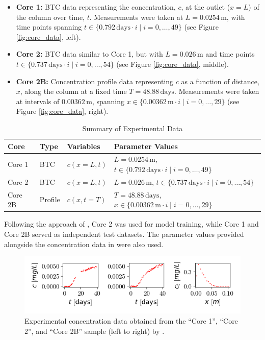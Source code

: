 \begin{itemize}
    \item \textbf{Core 1:} BTC data representing the concentration, $c$, at the outlet ($x = L$) of the column over time, $t$. Measurements were taken at $L = 0.0254\,\text{m}$, with time points spanning $t \in \{0.792\,\text{days} \cdot i \mid i = 0, \dots, 49\}$ (see Figure \vref{fig:core_data}, left).
    \item \textbf{Core 2:} BTC data similar to Core 1, but with $L = 0.026\,\text{m}$ and time points $t \in \{0.737\,\text{days} \cdot i \mid i = 0, \dots, 54\}$ (see Figure \vref{fig:core_data}, middle).
    \item \textbf{Core 2B:} Concentration profile data representing $c$ as a function of distance, $x$, along the column at a fixed time $T = 48.88\,\text{days}$. Measurements were taken at intervals of $0.00362\,\text{m}$, spanning $x \in \{0.00362\,\text{m} \cdot i \mid i = 0, \dots, 29\}$ (see Figure \vref{fig:core_data}, right).
\end{itemize}

\begin{table}[h!]
    \centering
    \caption{Summary of Experimental Data}
    \label{tab:experimental_data}
    \begin{tabular}{llll}
        \toprule
        Core   & Type       & Variables                 & Parameter Values                                      \\
        \midrule
        Core 1 & BTC        & $c(x=L, t)$              & $L = 0.0254\,\text{m}$, $t \in \{0.792\,\text{days} \cdot i \mid i = 0, \dots, 49\}$ \\
        Core 2 & BTC        & $c(x=L, t)$              & $L = 0.026\,\text{m}$, $t \in \{0.737\,\text{days} \cdot i \mid i = 0, \dots, 54\}$  \\
        Core 2B & Profile    & $c(x, t=T)$              & $T = 48.88\,\text{days}$, $x \in \{0.00362\,\text{m} \cdot i \mid i = 0, \dots, 29\}$ \\
        \bottomrule
    \end{tabular}
\end{table}

Following the approach of \cite{finn}, Core 2 was used for model training, while Core 1 and Core 2B served as independent test datasets. The parameter values provided alongside the concentration data in \cite{nowak2016entropy} were also used.


\begin{figure}[h]
    \centering
    \includegraphics{figs/core_data.png}
    \caption{Experimental concentration data obtained from the ``Core 1'', ``Core 2'', and ``Core 2B'' sample (left to right) by \cite{nowak2016entropy}.}
    \label{fig:core_data}
\end{figure}



